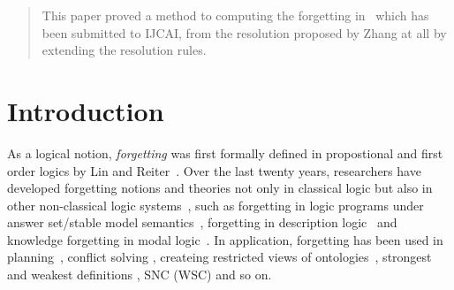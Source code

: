 \documentclass[letterpaper]{article} %
\begin{document}
\newcommand{\CTLsnf}{{\textsc{SNF}_{\textsc{ctl}}^g}}
\newcommand{\ResC}{{\textsc{R}_{\textsc{ctl}}^{\succ, S}}}
\newcommand{\CTLforget}{{\textsc{F}_{\textsc{ctl}}}}
\newcommand{\Refine}{\textsc{Refine}}
\newcommand{\cf}{\textrm{cf.}}
\newcommand{\NEXP}{\textmd{\rm NEXP}}
\newcommand{\EXP}{\textmd{\rm EXP}}
\newcommand{\coNEXP}{\textmd{\rm co-NEXP}}
\newcommand{\NP}{\textmd{\rm NP}}
\newcommand{\coNP}{\textmd{\rm co-NP}}
\newcommand{\Pol}{\textmd{\rm P}}
\newcommand{\BH}[1]{\textmd{\rm BH}_{#1}}
\newcommand{\coBH}[1]{\textmd{\rm co-BH}_{#1}}
\newcommand{\Empty}{\varnothing}
\newcommand{\NLOG}{\textmd{\rm NLOG}}
\newcommand{\DeltaP}[1]{\Delta_{#1}^{p}}
\newcommand{\PIP}[1]{\Pi_{#1}^{p}}
\newcommand{\SigmaP}[1]{\Sigma_{#1}^{p}}



\maketitle

\begin{abstract}
This paper proved a method to computing the forgetting in \CTL\, which has been submitted to IJCAI, from
the resolution proposed by Zhang at all by extending the resolution rules.

\end{abstract}

\section{Introduction}
As a logical notion, \emph{forgetting} was first formally defined
in propostional and first order logics by Lin and Reiter~\cite{lin1994forget}.
Over the last twenty years, researchers have developed forgetting notions and theories not only in classical logic but also in other non-classical logic systems~\cite{eiter2019brief}, such as forgetting in logic programs under answer set/stable model semantics~\cite{DBLP:Zhang:AIJ2006,Eiter2008Semantic,Wong:PhD:Thesis,Yisong:KR:2012,Yisong:IJCAI:2013}, forgetting in description logic~\cite{Wang:AMAI:2010,Lutz:IJCAI:2011,zhao2017role} and knowledge forgetting in modal logic~\cite{Yan:AIJ:2009,Kaile:JAIR:2009,Yongmei:IJCAI:2011,fang2019forgetting}. In application, forgetting has been used in planning~\cite{lin2003compiling},  conflict solving \cite{Lang2010Reasoning,Zhang2005Solving},
createing restricted views of ontologies~\cite{zhao2017role},
strongest and weakest definitions \cite{Lang2008On}, SNC (WSC) \cite{DBLP:journals/ai/Lin01} and so on.
\end{document}
